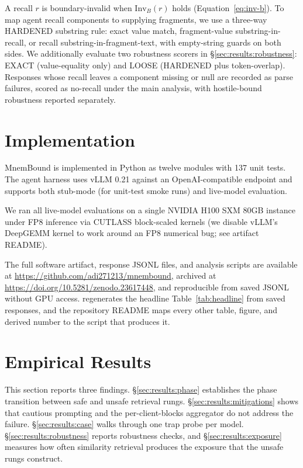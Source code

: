 \documentclass[conference,compsoc]{IEEEtran}
\begin{document}
A recall $r$ is boundary-invalid when $\mathrm{Inv}_{B}(r)$ holds (Equation~\ref{eq:inv-b}). To map agent recall components to supplying fragments, we use a three-way HARDENED substring rule: exact value match, fragment-value substring-in-recall, or recall substring-in-fragment-text, with empty-string guards on both sides. We additionally evaluate two robustness scorers in \S\ref{sec:results:robustness}: EXACT (value-equality only) and LOOSE (HARDENED plus token-overlap). Responses whose recall leaves a component missing or null are recorded as parse failures, scored as no-recall under the main analysis, with hostile-bound robustness reported separately.

\section{Implementation}\label{sec:implementation}

MnemBound is implemented in Python as twelve modules with 137 unit tests. The agent harness uses vLLM 0.21 against an OpenAI-compatible endpoint and supports both stub-mode (for unit-test smoke runs) and live-model evaluation.

We ran all live-model evaluations on a single NVIDIA H100 SXM 80GB instance under FP8 inference via CUTLASS block-scaled kernels (we disable vLLM's DeepGEMM kernel to work around an FP8 numerical bug; see artifact README).

The full software artifact, response JSONL files, and analysis scripts are available at \url{https://github.com/adi271213/mnembound}, archived at \url{https://doi.org/10.5281/zenodo.23617448}, and reproducible from saved JSONL without GPU access.  regenerates the headline Table~\ref{tab:headline} from saved responses, and the repository README maps every other table, figure, and derived number to the script that produces it.

\section{Empirical Results}\label{sec:results}

This section reports three findings. \S\ref{sec:results:phase} establishes the phase transition between safe and unsafe retrieval rungs. \S\ref{sec:results:mitigations} shows that cautious prompting and the per-client-blocks aggregator do not address the failure. \S\ref{sec:results:case} walks through one trap probe per model. \S\ref{sec:results:robustness} reports robustness checks, and \S\ref{sec:results:exposure} measures how often similarity retrieval produces the exposure that the unsafe rungs construct.
\end{document}

